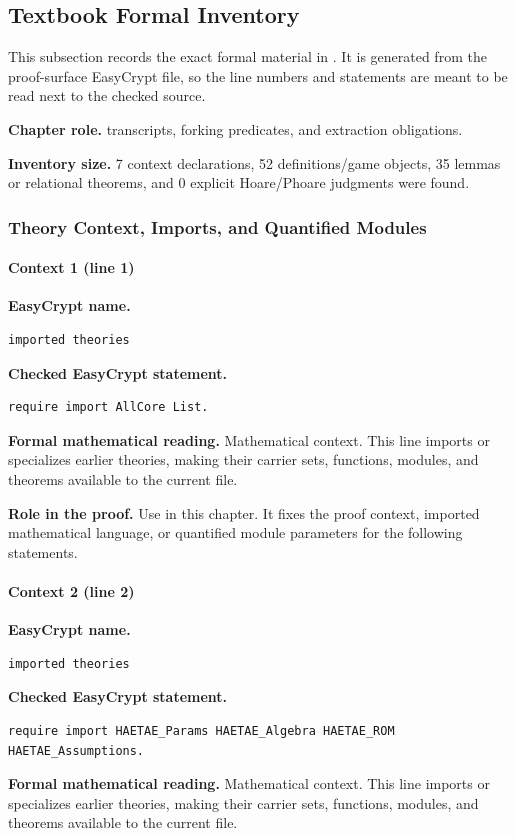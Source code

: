 \subsection*{Textbook Formal Inventory}
This subsection records the exact formal material in .  It is generated from the proof-surface EasyCrypt file, so the line numbers and statements are meant to be read next to the checked source.

\noindent\textbf{Chapter role.} transcripts, forking predicates, and extraction obligations.

\noindent\textbf{Inventory size.} 7 context declarations, 52 definitions/game objects, 35 lemmas or relational theorems, and 0 explicit Hoare/Phoare judgments were found.

\subsubsection*{Theory Context, Imports, and Quantified Modules}
\paragraph{Context 1 (line 1)}
\noindent\textbf{EasyCrypt name.}
\begin{lstlisting}[language=EasyCrypt,basicstyle=\ttfamily\scriptsize]
imported theories
\end{lstlisting}
\noindent\textbf{Checked EasyCrypt statement.}
\begin{lstlisting}[language=EasyCrypt,basicstyle=\ttfamily\scriptsize]
require import AllCore List.
\end{lstlisting}
\noindent\textbf{Formal mathematical reading.}
Mathematical context. This line imports or specializes earlier theories, making their carrier sets, functions, modules, and theorems available to the current file.

\noindent\textbf{Role in the proof.}
Use in this chapter. It fixes the proof context, imported mathematical language, or quantified module parameters for the following statements.

\paragraph{Context 2 (line 2)}
\noindent\textbf{EasyCrypt name.}
\begin{lstlisting}[language=EasyCrypt,basicstyle=\ttfamily\scriptsize]
imported theories
\end{lstlisting}
\noindent\textbf{Checked EasyCrypt statement.}
\begin{lstlisting}[language=EasyCrypt,basicstyle=\ttfamily\scriptsize]
require import HAETAE_Params HAETAE_Algebra HAETAE_ROM HAETAE_Assumptions.
\end{lstlisting}
\noindent\textbf{Formal mathematical reading.}
Mathematical context. This line imports or specializes earlier theories, making their carrier sets, functions, modules, and theorems available to the current file.

